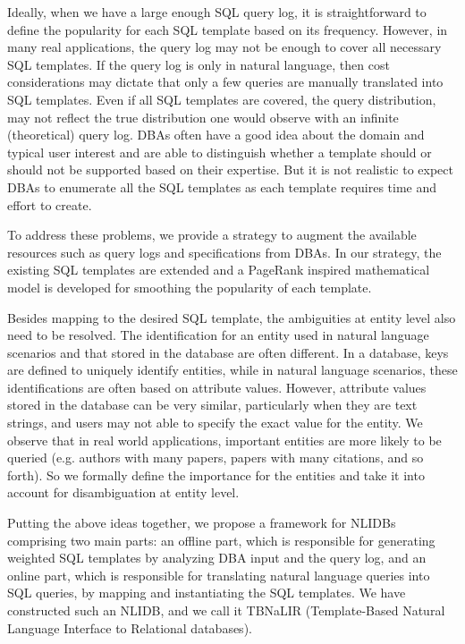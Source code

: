 \documentclass{vldb}
\begin{document}
Ideally, when we have a large enough SQL query log, it is straightforward to define the popularity for each SQL template based on its frequency.  However, in many real applications, the query log may not be enough to cover all necessary SQL templates.  If the query log is only in natural language, then cost considerations may dictate that only a few queries are manually translated into SQL templates.  Even if all SQL templates are covered, the query distribution, may not reflect the true distribution one would observe with an infinite (theoretical) query log.  DBAs often have a good idea about the domain and typical user interest and are able to distinguish whether a template should or should not be supported based on their expertise.  But it is not realistic to expect DBAs to enumerate all the SQL templates as each template requires time and effort to create.

To address these problems, we provide a strategy to augment the available resources such as query logs and specifications from DBAs.  In our strategy, the existing SQL templates are extended and a PageRank inspired mathematical model is developed for smoothing the popularity of each template.  

Besides mapping to the desired SQL template, the ambiguities at entity level also need to be resolved.  The identification for an entity used in natural language scenarios and that stored in the database are often different.  In a database, keys are defined to uniquely identify entities, while in natural language scenarios, these identifications are often based on attribute values.  However, attribute values stored in the database can be very similar, particularly when they are text strings, and users may not able to specify the exact value for the entity.  We observe that in real world applications, important entities are more likely to be queried (e.g. authors with many papers, papers with many citations, and so forth).  So we formally define the importance for the entities and take it into account for disambiguation at entity level.  

Putting the above ideas together, we propose a framework for NLIDBs comprising two main parts: an offline part, which is responsible for generating weighted SQL templates by analyzing DBA input and the query log, and an online part, which is responsible for translating natural language queries into SQL queries, by mapping and instantiating the SQL templates.  We have constructed such an NLIDB, and we call it TBNaLIR (Template-Based Natural Language Interface to Relational databases).
\end{document}
